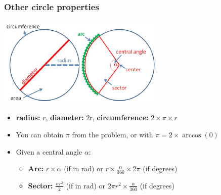 \begin{frame}
  \frametitle{Other circle properties}
    \begin{center}
      \includegraphics[width=0.6\textwidth]{../img/circle_halim0}
    \end{center}

    \begin{itemize}
      \item {\bf radius:} $r$, {\bf diameter:} 2r, {\bf circumference:} $2\times\pi\times r$
      \item You can obtain $\pi$ from the problem, or with $\pi = 2\times \arccos(0)$
      \item Given a central angle $\alpha$:
      \begin{itemize}
        \item {\bf Arc:} $r\times\alpha$ (if in rad) or $r\times\frac{\alpha}{360}\times2\pi$ (if degrees)
        \item {\bf Sector:} $\frac{\alpha r^2}{2}$ (if in rad) or $2\pi r^2 \times \frac{\alpha}{360}$ (if degrees)
      \end{itemize}
    \end{itemize}
\end{frame}

